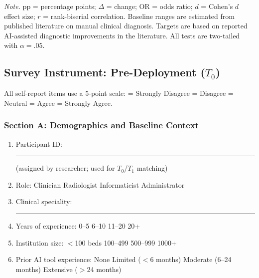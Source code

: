 \vspace{0.5em}\noindent\textit{Note.} pp = percentage points; $\Delta$ = change; OR = odds ratio; $d$ = Cohen's $d$ effect size; $r$ = rank-biserial correlation. Baseline ranges are estimated from published literature on manual clinical diagnosis. Targets are based on reported AI-assisted diagnostic improvements in the literature. All tests are two-tailed with $\alpha = .05$.

\subsection{Survey Instrument: Pre-Deployment ($T_0$)}

All self-report items use a 5-point scale:  = Strongly Disagree \quad {} = Disagree \quad {} = Neutral \quad {} = Agree \quad {} = Strongly Agree.

\subsubsection{Section A: Demographics and Baseline Context}

\begin{enumerate}[label=\textbf{D\arabic*.}]
    \item Participant ID: \rule{3cm}{0.4pt} \quad (assigned by researcher; used for $T_0$/$T_1$ matching)
    \item Role: \fbox{\phantom{x}} Clinician \quad \fbox{\phantom{x}} Radiologist \quad \fbox{\phantom{x}} Informaticist \quad \fbox{\phantom{x}} Administrator
    \item Clinical speciality: \rule{4cm}{0.4pt}
    \item Years of experience: \fbox{\phantom{x}} 0--5 \quad \fbox{\phantom{x}} 6--10 \quad \fbox{\phantom{x}} 11--20 \quad \fbox{\phantom{x}} 20+
    \item Institution size: \fbox{\phantom{x}} $<$100 beds \quad \fbox{\phantom{x}} 100--499 \quad \fbox{\phantom{x}} 500--999 \quad \fbox{\phantom{x}} 1000+
    \item Prior AI tool experience: \fbox{\phantom{x}} None \quad \fbox{\phantom{x}} Limited ($<$6 months) \quad \fbox{\phantom{x}} Moderate (6--24 months) \quad \fbox{\phantom{x}} Extensive ($>$24 months)
\end{enumerate}

